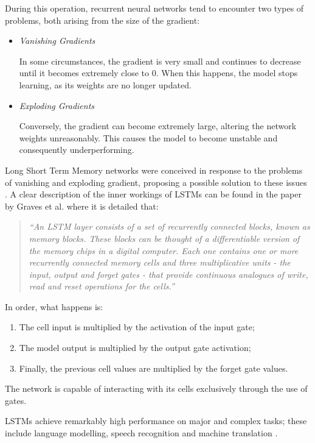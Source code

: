 \documentclass[letterpaper,11pt]{article}
\begin{document}
During this operation, recurrent neural networks tend to encounter two types of problems, both arising from the size of the gradient:
\begin{itemize}
  \item \textit{Vanishing Gradients}
  
  In some circumstances, the gradient is very small and continues to decrease until it becomes extremely close to 0. When this happens, the model stops learning, as its weights are no longer updated.

  \item \textit{Exploding Gradients}
  
  Conversely, the gradient can become extremely large, altering the network weights unreasonably. This causes the model to become unstable and consequently underperforming.
\end{itemize}

Long Short Term Memory networks were conceived in response to the problems of vanishing and exploding gradient, proposing a possible solution to these issues \cite{LSTM_gentle_intro}. A clear description of the inner workings of LSTMs can be found in the paper by Graves et al. \cite{Graves2005FramewisePC} where it is detailed that:

\begin{quote}
  \textit{``An LSTM layer consists of a set of recurrently connected blocks, known as memory blocks. These blocks can be thought of a differentiable version of the memory chips in a digital computer. Each one contains one or more recurrently connected memory cells and three multiplicative units - the input, output and forget gates - that provide continuous analogues of write, read and reset operations for the cells.''}
\end{quote}

In order, what happens is:
\begin{enumerate}
  \item The cell input is multiplied by the activation of the input gate;
  \item The model output is multiplied by the output gate activation;
  \item Finally, the previous cell values are multiplied by the forget gate values. 
\end{enumerate}

The network is capable of interacting with its cells exclusively through the use of gates.  

LSTMs achieve remarkably high performance on major and complex tasks; these include language modelling, speech recognition and machine translation \cite{Zaremba2014RecurrentNN}.
\end{document}
